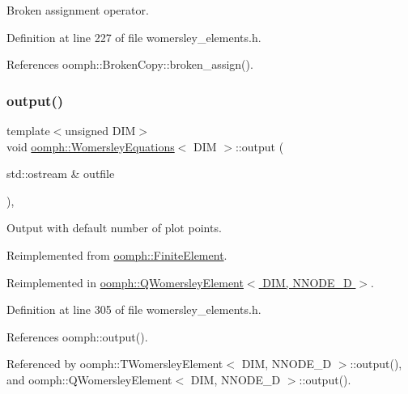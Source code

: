 Broken assignment operator. 



Definition at line 227 of file womersley\+\_\+elements.\+h.



References oomph\+::\+Broken\+Copy\+::broken\+\_\+assign().

\mbox{\label{classoomph_1_1WomersleyEquations_a9c1246d883f937888bf052b7078aee9a}} 
\subsubsection{\texorpdfstring{output()}{output()}\hspace{0.1cm}{\footnotesize\ttfamily [1/4]}}
{\footnotesize\ttfamily template$<$unsigned D\+IM$>$ \\
void \hyperlink{classoomph_1_1WomersleyEquations}{oomph\+::\+Womersley\+Equations}$<$ D\+IM $>$\+::output (\begin{DoxyParamCaption}\item[{std\+::ostream \&}]{outfile }\end{DoxyParamCaption})\hspace{0.3cm}{\ttfamily [inline]}, {\ttfamily [virtual]}}



Output with default number of plot points. 



Reimplemented from \hyperlink{classoomph_1_1FiniteElement_a2ad98a3d2ef4999f1bef62c0ff13f2a7}{oomph\+::\+Finite\+Element}.



Reimplemented in \hyperlink{classoomph_1_1QWomersleyElement_a5a8951b6a947e120821c1a83048975d4}{oomph\+::\+Q\+Womersley\+Element$<$ D\+I\+M, N\+N\+O\+D\+E\+\_\+D $>$}.



Definition at line 305 of file womersley\+\_\+elements.\+h.



References oomph\+::output().



Referenced by oomph\+::\+T\+Womersley\+Element$<$ D\+I\+M, N\+N\+O\+D\+E\+\_\+D $>$\+::output(), and oomph\+::\+Q\+Womersley\+Element$<$ D\+I\+M, N\+N\+O\+D\+E\+\_\+D $>$\+::output().

